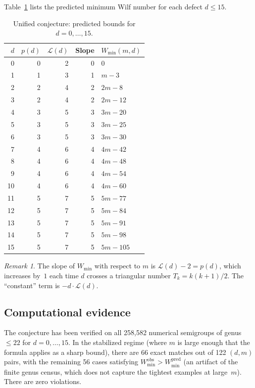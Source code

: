 \documentclass[11pt]{amsart}
\theoremstyle{definition}
\theoremstyle{remark}
\newtheorem{remark}[theorem]{Remark}
\begin{document}
Table~\ref{tab:conjecture} lists the predicted minimum Wilf number
for each defect $d \le 15$.

\begin{table}[ht]
\centering
\caption{Unified conjecture: predicted bounds for $d = 0, \ldots, 15$.}\label{tab:conjecture}
\begin{tabular}{rrrrl}
\toprule
$d$ & $p(d)$ & $\mathcal{L}(d)$ & Slope & $W_{\min}(m, d)$ \\
\midrule
0  & 0 & 2 & 0 & $0$ \\
1  & 1 & 3 & 1 & $m - 3$ \\
2  & 2 & 4 & 2 & $2m - 8$ \\
3  & 2 & 4 & 2 & $2m - 12$ \\
4  & 3 & 5 & 3 & $3m - 20$ \\
5  & 3 & 5 & 3 & $3m - 25$ \\
6  & 3 & 5 & 3 & $3m - 30$ \\
7  & 4 & 6 & 4 & $4m - 42$ \\
8  & 4 & 6 & 4 & $4m - 48$ \\
9  & 4 & 6 & 4 & $4m - 54$ \\
10 & 4 & 6 & 4 & $4m - 60$ \\
11 & 5 & 7 & 5 & $5m - 77$ \\
12 & 5 & 7 & 5 & $5m - 84$ \\
13 & 5 & 7 & 5 & $5m - 91$ \\
14 & 5 & 7 & 5 & $5m - 98$ \\
15 & 5 & 7 & 5 & $5m - 105$ \\
\bottomrule
\end{tabular}
\end{table}

\begin{remark}
The slope of $W_{\min}$ with respect to $m$ is
$\mathcal{L}(d) - 2 = p(d)$, which increases by~$1$ each time $d$ crosses
a triangular number $T_k = k(k+1)/2$.  The ``constant'' term is
$-d \cdot \mathcal{L}(d)$.
\end{remark}

\subsection{Computational evidence}

The conjecture has been verified on all 258{,}582 numerical semigroups
of genus $\le 22$ for $d = 0, \ldots, 15$.
In the stabilized regime (where $m$ is large enough that the formula
applies as a sharp bound), there are 66 exact matches out of 122
$(d, m)$ pairs, with the remaining 56 cases satisfying $W_{\min}^{\text{obs}}
> W_{\min}^{\text{pred}}$ (an artifact of the finite genus census, which
does not capture the tightest examples at large~$m$).
There are zero violations.
\end{document}
